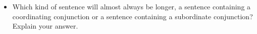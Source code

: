 \documentclass[12pt]{article}
\begin{document}
\begin{tcolorbox}[colframe=black!60, colback=white, 
coltitle=black, colbacktitle=black!15, fonttitle=\bfseries\Large, 
title=Exit Ticket, halign title=center, left=10pt, right=10pt, top=10pt, bottom=15pt]

\begin{itemize}
    \item Which kind of sentence will almost always be longer, a sentence containing a coordinating conjunction or a sentence containing a subordinate conjunction? Explain your answer.
 
    
    \vspace{2em}
     \underline{\hspace{14.6cm}}  
    \\[0.8cm] \underline{\hspace{14.6cm}}  
    \\[0.8cm] \underline{\hspace{14.6cm}}
    



\end{itemize}
\end{tcolorbox}
\end{document}
